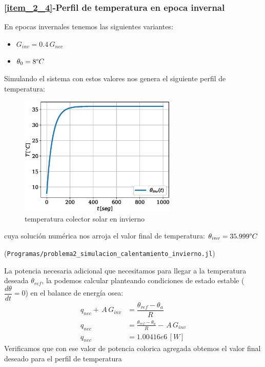 \subsubsection{\ref{item_2_4}-Perfil de temperatura en epoca invernal}
En epocas invernales tenemos las siguientes variantes:

\begin{itemize}
   \item $G_{inv}=0.4\,G_{nec}$
   \item $\theta_{0} = 8 \degree C$
\end{itemize}
Simulando el sistema con estos valores nos genera el siguiente perfil de temperatura:

\begin{figure}[H]
   \centering
   \includegraphics[width=0.67\textwidth]{Images/temperatura_colector_invierno.eps}
   \caption{temperatura colector solar en invierno}\label{fig:colector_temperatura_invierno}
\end{figure}

cuya solución numérica nos arroja el valor final de temperatura: $\theta_{inv} = 35.999 \degree C$

(\verb|Programas/problema2_simulacion_calentamiento_invierno.jl|)

La potencia necesaria adicional que necesitamos para llegar a la temperatura deseada $\theta_{ref}$, la podemos calcular
planteando condiciones de estado estable ($\dfrac{d\theta}{dt}=0$) en el balance de energía osea:
\begin{align}
   q_{nec}+\,A\,G_{inv}&=\dfrac{\theta_{ref}-\theta_{a}}{R}\\
   q_{nec}&=\frac{\theta_{ref}-\theta_{a}}{R}-\,A\,G_{inv}\\
   q_{nec}&=1.00416e6\,[W]
\end{align}
Verificamos que con ese valor de potencia colorica agregada obtemos el valor final deseado para el perfil de temperatura


